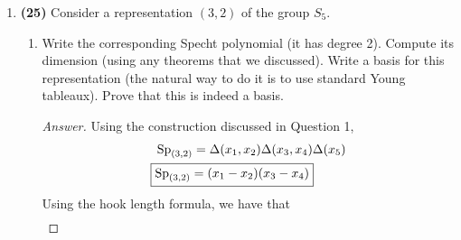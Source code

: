 \documentclass[../notes.tex]{subfiles}
\begin{document}
\begin{enumerate}
\begin{proof}[Answer]
        $(123)=(12)(23)$: Even, sign = 1.\par
        Thus, overall, the character is
        \begin{equation*}
            (1,1,-1,-1,1)
        \end{equation*}
        \underline{$(2,2)$}: Use Specht modules, as in the example from the Final Review Sheet above. This yields the character
        \begin{equation*}
            (2,2,0,0,-1)
        \end{equation*}
        \underline{$(3,1)$}: Subtract the trivial from the permutational representation. The trivial, we've already found. The permutational is given by the number of elements fixed under each type of permutation, i.e., is $(4,0,2,0,1)$. Subtracting 1 from each of these values yields
        \begin{equation*}
            (3,-1,1,-1,0)
        \end{equation*}
        \underline{$(2,1,1)$}: Try $(3,1)\otimes(1,1,1,1)$. This yields the following representation, distinct from the others, that is still irreducible by the irreducibility criterion.
        \begin{equation*}
            (3,-1,-1,1,0)
        \end{equation*}
        Note: An alternative, quicker way to solve this question would have been to save $(2,2)$ until last and then fill it in with orthogonality relations.
    \end{proof}
    \item \textbf{(25)} Consider a representation $(3,2)$ of the group $S_5$.
    \begin{enumerate}
        \item Write the corresponding Specht polynomial (it has degree 2). Compute its dimension (using any theorems that we discussed). Write a basis for this representation (the natural way to do it is to use standard Young tableaux). Prove that this is indeed a basis.
        \begin{proof}[Answer]
            Using the construction discussed in Question 1,
            \begin{align*}
                \Sp_{(3,2)} &= \Delta(x_1,x_2)\Delta(x_3,x_4)\Delta(x_5)\\
                \Aboxed{\Sp_{(3,2)} &= (x_1-x_2)(x_3-x_4)}
            \end{align*}
            Using the hook length formula, we have that
            \begin{align*}

\end{align*}
\end{proof}
\end{enumerate}
\end{enumerate}
\end{document}
